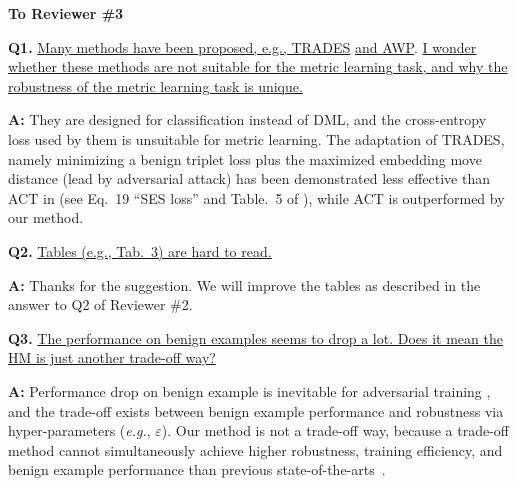 \documentclass[10pt,twocolumn,letterpaper]{article}
\begin{document}
\vspace{0.3em}
\noindent\textbf{To Reviewer \#3}
\vspace{0.3em}

\noindent\textbf{Q1.}
%
\ul{Many methods have been proposed, e.g., TRADES}\cite{trades} \ul{and AWP}\cite{awp}.
\ul{I wonder whether these methods are not suitable for the metric learning task, and why the robustness of the metric learning task is unique.
}

\noindent\textbf{A:}
%
They are designed for classification instead of DML, and the cross-entropy loss
used by them is unsuitable for metric learning.
%
The adaptation of TRADES, namely minimizing a benign triplet loss plus the
maximized embedding move distance (lead by adversarial attack) has been
demonstrated less effective than ACT in \cite{robrank} (see Eq.~19 ``SES loss''
and Table.~5 of \cite{robrank}), while ACT is outperformed by our method.


\noindent\textbf{Q2.}
%
\ul{Tables (e.g., Tab.~3) are hard to read.}

\noindent\textbf{A:} Thanks for the suggestion. We will improve the tables as described in the answer to Q2 of Reviewer \#2.

\noindent\textbf{Q3.}
%
\ul{The performance on benign examples seems to drop a lot. Does it mean the
HM is just another trade-off way?}

\noindent\textbf{A:}
%
Performance drop on benign example is inevitable for adversarial training
\cite{madry,trades,awp,advrank,robrank}, and the trade-off exists
between benign example performance and robustness via hyper-parameters
(\emph{e.g.}, $\varepsilon$).
%
Our method is not a trade-off way, because a trade-off method cannot
simultaneously achieve higher robustness, training efficiency, and benign
example performance than previous state-of-the-arts~\cite{advrank,robrank}.

{\small


}
\end{document}
